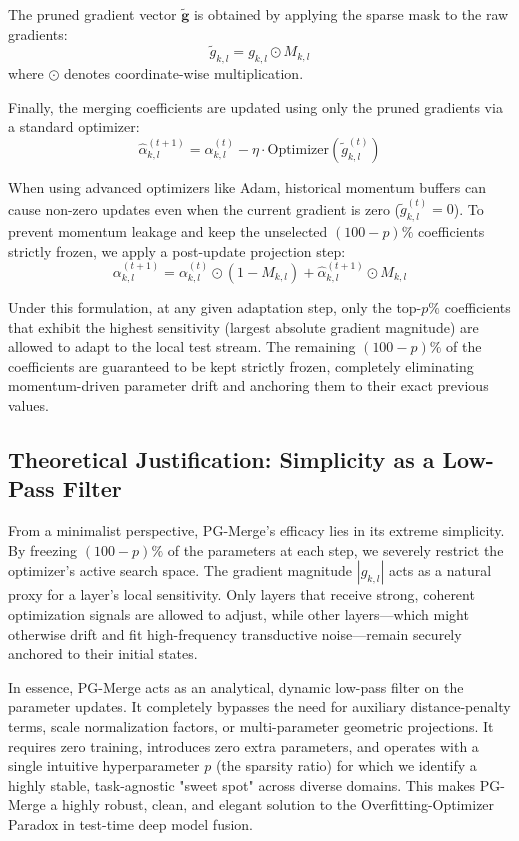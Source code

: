 The pruned gradient vector $\tilde{\mathbf{g}}$ is obtained by applying the sparse mask to the raw gradients:
\begin{equation}
    \tilde{g}_{k, l} = g_{k, l} \odot M_{k, l}
    \label{eq:pruning_op}
\end{equation}
where $\odot$ denotes coordinate-wise multiplication.

Finally, the merging coefficients are updated using only the pruned gradients via a standard optimizer:
\begin{equation}
    \hat{\alpha}_{k, l}^{(t+1)} = \alpha_{k, l}^{(t)} - \eta \cdot \text{Optimizer}(\tilde{g}_{k, l}^{(t)})
    \label{eq:update}
\end{equation}

When using advanced optimizers like Adam, historical momentum buffers can cause non-zero updates even when the current gradient is zero ($\tilde{g}_{k, l}^{(t)} = 0$). To prevent momentum leakage and keep the unselected $(100-p)\%$ coefficients strictly frozen, we apply a post-update projection step:
\begin{equation}
    \alpha_{k, l}^{(t+1)} = \alpha_{k, l}^{(t)} \odot (1 - M_{k, l}) + \hat{\alpha}_{k, l}^{(t+1)} \odot M_{k, l}
    \label{eq:projection}
\end{equation}

Under this formulation, at any given adaptation step, only the top-$p\%$ coefficients that exhibit the highest sensitivity (largest absolute gradient magnitude) are allowed to adapt to the local test stream. The remaining $(100-p)\%$ of the coefficients are guaranteed to be kept strictly frozen, completely eliminating momentum-driven parameter drift and anchoring them to their exact previous values.

\subsection{Theoretical Justification: Simplicity as a Low-Pass Filter}
From a minimalist perspective, PG-Merge's efficacy lies in its extreme simplicity. By freezing $(100-p)\%$ of the parameters at each step, we severely restrict the optimizer's active search space. The gradient magnitude $|g_{k, l}|$ acts as a natural proxy for a layer's local sensitivity. Only layers that receive strong, coherent optimization signals are allowed to adjust, while other layers---which might otherwise drift and fit high-frequency transductive noise---remain securely anchored to their initial states.

In essence, PG-Merge acts as an analytical, dynamic low-pass filter on the parameter updates. It completely bypasses the need for auxiliary distance-penalty terms, scale normalization factors, or multi-parameter geometric projections. It requires zero training, introduces zero extra parameters, and operates with a single intuitive hyperparameter $p$ (the sparsity ratio) for which we identify a highly stable, task-agnostic "sweet spot" across diverse domains. This makes PG-Merge a highly robust, clean, and elegant solution to the Overfitting-Optimizer Paradox in test-time deep model fusion.